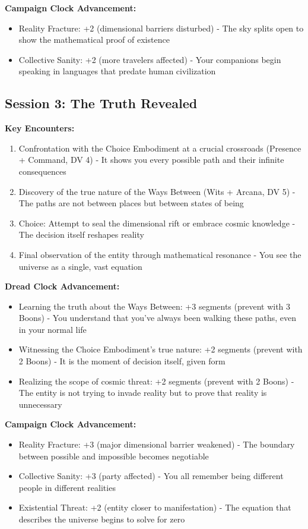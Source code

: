 \documentclass[11pt]{article}
\begin{document}
\textbf{Campaign Clock Advancement:}
\begin{itemize}
\item Reality Fracture: +2 (dimensional barriers disturbed) - The sky splits open to show the mathematical proof of existence
\item Collective Sanity: +2 (more travelers affected) - Your companions begin speaking in languages that predate human civilization
\end{itemize}

\subsection{Session 3: The Truth Revealed}

\textbf{Key Encounters:}
\begin{enumerate}
\item Confrontation with the Choice Embodiment at a crucial crossroads (Presence + Command, DV 4) - It shows you every possible path and their infinite consequences
\item Discovery of the true nature of the Ways Between (Wits + Arcana, DV 5) - The paths are not between places but between states of being
\item Choice: Attempt to seal the dimensional rift or embrace cosmic knowledge - The decision itself reshapes reality
\item Final observation of the entity through mathematical resonance - You see the universe as a single, vast equation
\end{enumerate}

\textbf{Dread Clock Advancement:}
\begin{itemize}
\item Learning the truth about the Ways Between: +3 segments (prevent with 3 Boons) - You understand that you've always been walking these paths, even in your normal life
\item Witnessing the Choice Embodiment's true nature: +2 segments (prevent with 2 Boons) - It is the moment of decision itself, given form
\item Realizing the scope of cosmic threat: +2 segments (prevent with 2 Boons) - The entity is not trying to invade reality but to prove that reality is unnecessary
\end{itemize}

\textbf{Campaign Clock Advancement:}
\begin{itemize}
\item Reality Fracture: +3 (major dimensional barrier weakened) - The boundary between possible and impossible becomes negotiable
\item Collective Sanity: +3 (party affected) - You all remember being different people in different realities
\item Existential Threat: +2 (entity closer to manifestation) - The equation that describes the universe begins to solve for zero
\end{itemize}
\end{document}
